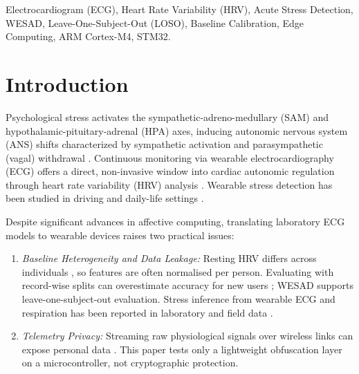 \documentclass[conference]{IEEEtran}
\begin{document}
\begin{IEEEkeywords}
Electrocardiogram (ECG), Heart Rate Variability (HRV), Acute Stress Detection, WESAD, Leave-One-Subject-Out (LOSO), Baseline Calibration, Edge Computing, ARM Cortex-M4, STM32.
\end{IEEEkeywords}

\section{Introduction}
Psychological stress activates the sympathetic-adreno-medullary (SAM) and hypothalamic-pituitary-adrenal (HPA) axes, inducing autonomic nervous system (ANS) shifts characterized by sympathetic activation and parasympathetic (vagal) withdrawal \cite{kirschbaum1993trier, kim2018stress}. Continuous monitoring via wearable electrocardiography (ECG) offers a direct, non-invasive window into cardiac autonomic regulation through heart rate variability (HRV) analysis \cite{taskforce1996hrv, shaffer2017overview}. Wearable stress detection has been studied in driving and daily-life settings \cite{healey2005detecting, can2019continuous}.

Despite significant advances in affective computing, translating laboratory ECG models to wearable devices raises two practical issues:
\begin{enumerate}
    \item \textit{Baseline Heterogeneity and Data Leakage:} Resting HRV differs across individuals \cite{shaffer2017overview}, so features are often normalised per person. Evaluating with record-wise splits can overestimate accuracy for new users \cite{saeb2017need}; WESAD \cite{schmidt2018wesad} supports leave-one-subject-out evaluation. Stress inference from wearable ECG and respiration has been reported in laboratory and field data \cite{plarre2011continuous}.
    \item \textit{Telemetry Privacy:} Streaming raw physiological signals over wireless links can expose personal data \cite{jiang2023wban}. This paper tests only a lightweight obfuscation layer on a microcontroller, not cryptographic protection.
\end{enumerate}
\end{document}
